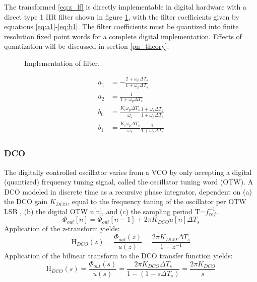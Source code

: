 	The transformed \ref{eq:z_lf} is directly implementable in digital hardware with a direct type 1 IIR filter shown in figure \ref{fig:filt_imple}, with the filter coefficients given by equations \ref{eq:a1}-\ref{eq:b1}. The filter coefficients must be quantized into finite resolution fixed point words for a complete digital implementation. Effects of quantization will be discussed in section \ref{pn_theory}.
	\begin{figure}[htb!]
		\center
		\caption{Implementation of filter.}
		\label{fig:filt_imple}
	\end{figure}
	\begin{align}
		a_1 &= -\frac{2+\omega_p\Delta T_s}{1+\omega_p\Delta T_s}\label{eq:a1}\\
		a_2 &= \frac{1}{1+\omega_p\Delta T_s} \\
		b_0 &= \frac{K_i\omega_p\Delta T_s}{\omega_z}\frac{1+\omega_z\Delta T_s}{1+\omega_p\Delta T_s}\\
		b_1 &= \frac{K_i\omega_p\Delta T_s}{\omega_z}\frac{1}{1+\omega_p\Delta T_s}\label{eq:b1}
	\end{align}

\subsubsection{DCO}
	The digitally controlled oscillator varies from a VCO by only accepting a digital (quantized) frequency tuning signal, called the oscillator tuning word (OTW). A DCO modeled in discrete time as a recursive phase integrator, dependent on (a) the DCO gain $K_{DCO}$, equal to the frequency tuning of the oscillator per OTW LSB , (b) the digital OTW u[n], and (c) the sampling period T=$f_{ref}^{-1}$.
	\begin{equation}
		\Phi_{out}[n] = \Phi_{out}[n-1] + 2\pi K_{DCO}u[n]\Delta T_s
	\end{equation}
	Application of the z-transform yields:
	\begin{equation}
		\mathrm{H}_{DCO}(z) = \frac{\Phi_{out}(z)}{u(z)} = \frac{2\pi K_{DCO}\Delta T_s}{1-z^{-1}}
	\end{equation}
	Application of the bilinear transform to the DCO transfer function yields:
	\begin{equation}
		\mathrm{H}_{DCO}(s) = \frac{\Phi_{out}(s)}{u(s)} = \frac{2\pi K_{DCO}\Delta T_s}{1-(1-s\Delta T_s)} = \frac{2\pi K_{DCO}}{s} 
	\end{equation}

